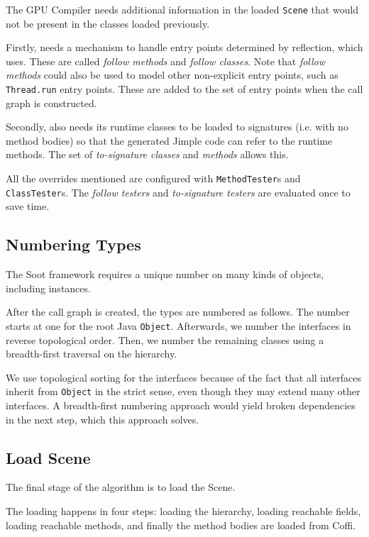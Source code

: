 \documentclass{sigplanconf}
\begin{document}
The \rb GPU Compiler needs additional information in the loaded {\tt Scene} that would not be present in the classes loaded previously.

Firstly, \rb needs a mechanism to handle entry points determined by reflection, which \rb uses. These are called \emph{follow methods} and \emph{follow classes}. Note that \emph{follow methods} could also be used to model other non-explicit entry points, such as {\tt Thread.run} entry points. These are added to the set of entry points when the call graph is constructed.

Secondly, \rb also needs its runtime classes to be loaded to signatures (i.e. with no method bodies) so that the generated Jimple code can refer to the runtime methods. The set of \emph{to-signature classes} and \emph{methods} allows this.

All the overrides mentioned are configured with {\tt MethodTester}s and {\tt ClassTester}s. The \emph{follow testers} and \emph{to-signature testers} are evaluated once to save time.

\subsection{Numbering Types}
\label{sec:numbering}
The Soot framework requires a unique number on many kinds of objects, including \sootclass instances.

After the call graph is created, the types are numbered as follows. The number starts at one for the root Java {\tt Object}. Afterwards, we number the interfaces in reverse topological order. Then, we number the remaining classes using a breadth-first traversal on the hierarchy.

We use topological sorting for the interfaces because of the fact that all interfaces inherit from {\tt Object} in the strict sense, even though they may extend many other interfaces. A breadth-first numbering approach would yield broken dependencies in the next step, which this approach solves. 

\subsection{Load Scene}
\label{sec:loadscene}
The final stage of the algorithm is to load the Scene. 

The loading happens in four steps: loading the hierarchy, loading reachable fields, loading reachable methods, and finally the method bodies are loaded from Coffi.
\end{document}
